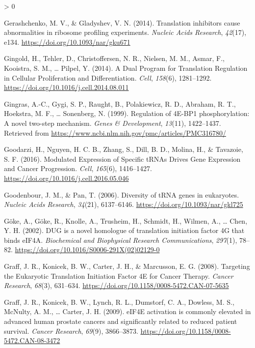 \documentclass[
  12pt,
  openany]{book}
\newlength{\cslhangindent}
\newenvironment{CSLReferences}[2] %
 {%
  \setlength{\parindent}{0pt}
  \ifodd #1 \everypar{\setlength{\hangindent}{\cslhangindent}}\ignorespaces\fi
  \ifnum #2 > 0
  \setlength{\parskip}{#2\baselineskip}
  \fi
 }%
 {}
\begin{document}
\begin{CSLReferences}{1}{0}
\leavevmode\hypertarget{ref-Gerashchenko2014}{}%
Gerashchenko, M. V., \& Gladyshev, V. N. (2014). Translation inhibitors cause abnormalities in ribosome profiling experiments. \emph{Nucleic Acids Research}, \emph{42}(17), e134. \url{https://doi.org/10.1093/nar/gku671}

\leavevmode\hypertarget{ref-Gingold2014}{}%
Gingold, H., Tehler, D., Christoffersen, N. R., Nielsen, M. M., Asmar, F., Kooistra, S. M., \ldots{} Pilpel, Y. (2014). A {Dual Program} for {Translation Regulation} in {Cellular Proliferation} and {Differentiation}. \emph{Cell}, \emph{158}(6), 1281--1292. \url{https://doi.org/10.1016/j.cell.2014.08.011}

\leavevmode\hypertarget{ref-Gingras1999}{}%
Gingras, A.-C., Gygi, S. P., Raught, B., Polakiewicz, R. D., Abraham, R. T., Hoekstra, M. F., \ldots{} Sonenberg, N. (1999). Regulation of {4E}-{BP1} phosphorylation: A novel two-step mechanism. \emph{Genes \& Development}, \emph{13}(11), 1422--1437. Retrieved from \url{https://www.ncbi.nlm.nih.gov/pmc/articles/PMC316780/}

\leavevmode\hypertarget{ref-Goodarzi2016}{}%
Goodarzi, H., Nguyen, H. C. B., Zhang, S., Dill, B. D., Molina, H., \& Tavazoie, S. F. (2016). Modulated {Expression} of {Specific tRNAs Drives Gene Expression} and {Cancer Progression}. \emph{Cell}, \emph{165}(6), 1416--1427. \url{https://doi.org/10.1016/j.cell.2016.05.046}

\leavevmode\hypertarget{ref-Goodenbour2006}{}%
Goodenbour, J. M., \& Pan, T. (2006). Diversity of {tRNA} genes in eukaryotes. \emph{Nucleic Acids Research}, \emph{34}(21), 6137--6146. \url{https://doi.org/10.1093/nar/gkl725}

\leavevmode\hypertarget{ref-Goke2002}{}%
Göke, A., Göke, R., Knolle, A., Trusheim, H., Schmidt, H., Wilmen, A., \ldots{} Chen, Y. H. (2002). {DUG} is a novel homologue of translation initiation factor {4G} that binds {eIF4A}. \emph{Biochemical and Biophysical Research Communications}, \emph{297}(1), 78--82. \url{https://doi.org/10.1016/S0006-291X(02)02129-0}

\leavevmode\hypertarget{ref-Graff2008}{}%
Graff, J. R., Konicek, B. W., Carter, J. H., \& Marcusson, E. G. (2008). Targeting the {Eukaryotic Translation Initiation Factor 4E} for {Cancer Therapy}. \emph{Cancer Research}, \emph{68}(3), 631--634. \url{https://doi.org/10.1158/0008-5472.CAN-07-5635}

\leavevmode\hypertarget{ref-Graff2009}{}%
Graff, J. R., Konicek, B. W., Lynch, R. L., Dumstorf, C. A., Dowless, M. S., McNulty, A. M., \ldots{} Carter, J. H. (2009). {eIF4E} activation is commonly elevated in advanced human prostate cancers and significantly related to reduced patient survival. \emph{Cancer Research}, \emph{69}(9), 3866--3873. \url{https://doi.org/10.1158/0008-5472.CAN-08-3472}


\end{CSLReferences}
\end{document}
